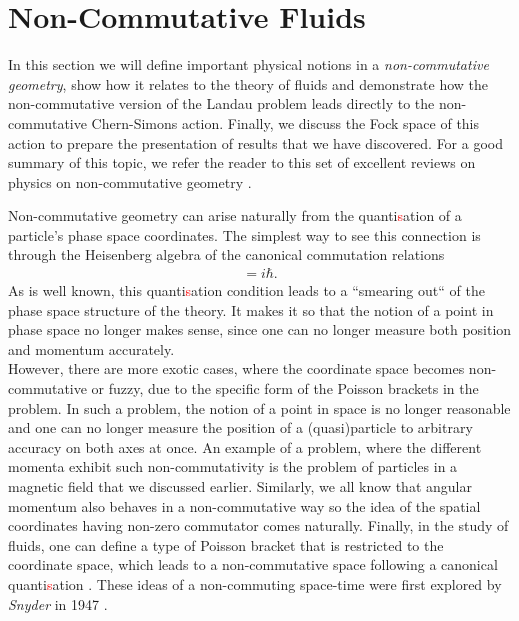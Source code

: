         \section{Non-Commutative Fluids}
    In this section we will define important physical notions in a \textit{non-commutative geometry}, show how it relates to the theory of fluids and demonstrate how the non-commutative version of the Landau problem leads directly to the non-commutative Chern-Simons action. Finally, we discuss the Fock space of this action to prepare the presentation of results that we have discovered. For a good summary of this topic, we refer the reader to this set of excellent reviews on physics on non-commutative geometry \cite{Polychronakos:2007df, Szabo:2001kg, Douglas:2001ba}.

    Non-commutative geometry can arise naturally from the quanti\textcolor{red}{s}ation of a particle's phase space coordinates. The simplest way to see this connection is through the Heisenberg algebra of the canonical commutation relations
    \begin{align}
        [\hat{x}, \hat{p}] = i \hbar.
    \end{align}
    As is well known, this quanti\textcolor{red}{s}ation condition leads to a ``smearing out`` of the phase space structure of the theory. It makes it so that the notion of a point in phase space no longer makes sense, since one can no longer measure both position and momentum accurately. \\
    \indent However, there are more exotic cases, where the coordinate space becomes non-commutative or fuzzy, due to the specific form of the Poisson brackets in the problem. In such a problem, the notion of a point in space is no longer reasonable and one can no longer measure the position of a (quasi)particle to arbitrary accuracy on both axes at once. An example of a problem, where the different momenta exhibit such non-commutativity is the problem of particles in a magnetic field that we discussed earlier. Similarly, we all know that angular momentum also behaves in a non-commutative way so the idea of the spatial coordinates having non-zero commutator comes naturally. Finally, in the study of fluids, one can define a type of Poisson bracket that is restricted to the coordinate space, which leads to a non-commutative space following a canonical quanti\textcolor{red}{s}ation \cite{Jackiw:2002pn}. These ideas of a non-commuting space-time were first explored by \textit{Snyder} in 1947 \cite{Snyder:1946qz, Snyder:1947nq}.
